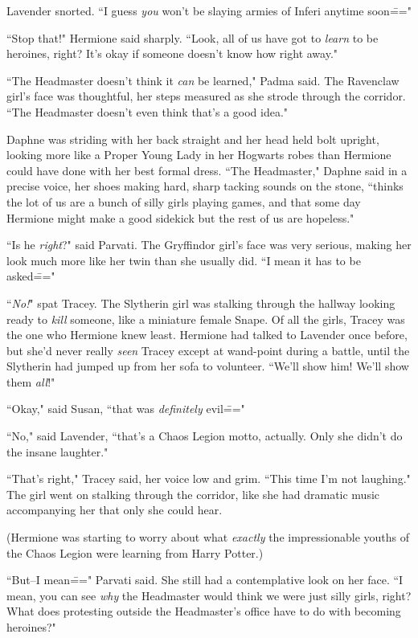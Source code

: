 Lavender snorted. ``I guess \emph{you} won't be slaying armies of Inferi anytime soon\==="

``Stop that!" Hermione said sharply. ``Look, all of us have got to \emph{learn} to be heroines, right? It's okay if someone doesn't know how right away."

``The Headmaster doesn't think it \emph{can} be learned," Padma said. The Ravenclaw girl's face was thoughtful, her steps measured as she strode through the corridor. ``The Headmaster doesn't even think that's a good idea."

Daphne was striding with her back straight and her head held bolt upright, looking more like a Proper Young Lady in her Hogwarts robes than Hermione could have done with her best formal dress. ``The Headmaster," Daphne said in a precise voice, her shoes making hard, sharp tacking sounds on the stone, ``thinks the lot of us are a bunch of silly girls playing games, and that some day Hermione might make a good sidekick but the rest of us are hopeless."

``Is he \emph{right}?" said Parvati. The Gryffindor girl's face was very serious, making her look much more like her twin than she usually did. ``I mean it has to be asked\==="

``\emph{No!}" spat Tracey. The Slytherin girl was stalking through the hallway looking ready to \emph{kill} someone, like a miniature female Snape. Of all the girls, Tracey was the one who Hermione knew least. Hermione had talked to Lavender once before, but she'd never really \emph{seen} Tracey except at wand-point during a battle, until the Slytherin had jumped up from her sofa to volunteer. ``We'll show him! We'll show them \emph{all}!"

``Okay," said Susan, ``that was \emph{definitely} evil\==="

``No," said Lavender, ``that's a Chaos Legion motto, actually. Only she didn't do the insane laughter."

``That's right," Tracey said, her voice low and grim. ``This time I'm not laughing." The girl went on stalking through the corridor, like she had dramatic music accompanying her that only she could hear.

(Hermione was starting to worry about what \emph{exactly} the impressionable youths of the Chaos Legion were learning from Harry Potter.)

``But\---I mean\===" Parvati said. She still had a contemplative look on her face. ``I mean, you can see \emph{why} the Headmaster would think we were just silly girls, right? What does protesting outside the Headmaster's office have to do with becoming heroines?"

